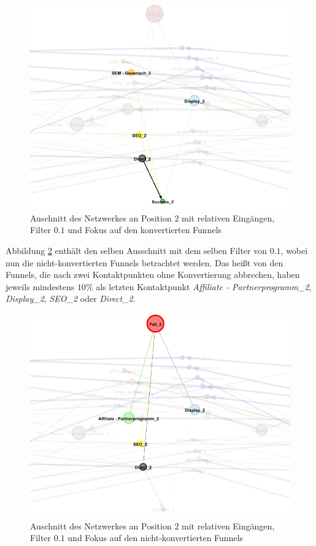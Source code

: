 \begin{figure}[H]
	\centering\includegraphics[scale=0.4]{in_filter_10_succ.png}\caption[Relative Eingänge mit Filter $0.1$ und Fokus auf Konvertierten]{Auschnitt des Netzwerkes an Position $2$ mit relativen Eingängen, Filter $0.1$ und Fokus auf den konvertierten Funnels}\label{in_filter_10_succ}
\end{figure}
Abbildung \ref{in_filter_10_fail} enthält den selben Ausschnitt mit dem selben Filter von $0.1$, wobei nun die nicht-konvertierten Funnels betrachtet werden. Das heißt von den Funnels, die nach zwei Kontaktpunkten ohne Konvertierung abbrechen, haben jeweils mindestens $10\%$ als letzten Kontaktpunkt \textit{Affiliate - Partnerprogramm\_2}, \textit{Display\_2}, \textit{SEO\_2} oder \textit{Direct\_2}.
\begin{figure}[H]
	\centering\includegraphics[scale=0.4]{in_filter_10_fail.png}\caption[Relative Eingänge mit Filter $0.1$ und Fokus auf Nicht-Konvertierten]{Auschnitt des Netzwerkes an Position $2$ mit relativen Eingängen, Filter $0.1$ und Fokus auf den nicht-konvertierten Funnels}\label{in_filter_10_fail}
\end{figure}